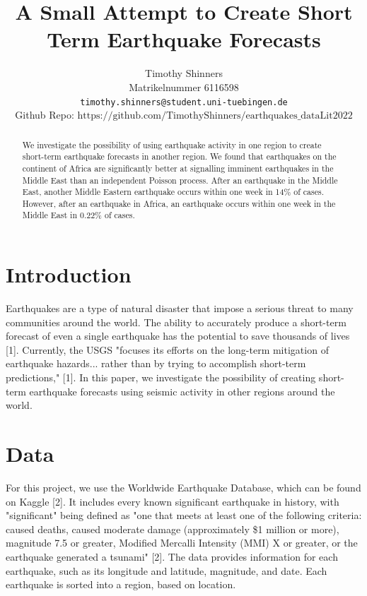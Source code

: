 \documentclass{article}
\title{A Small Attempt to Create Short Term Earthquake Forecasts}
\author{%
  Timothy Shinners\\
  Matrikelnummer 6116598\\
  \texttt{timothy.shinners@student.uni-tuebingen.de} \\
  Github Repo: $\textrm{https://github.com/TimothyShinners/earthquakes\_dataLit2022}$
}
\begin{document}
\maketitle

\begin{abstract}
  We investigate the possibility of using earthquake activity in one region to create short-term earthquake forecasts in another region. We found that earthquakes on the continent of Africa are significantly better at signalling imminent earthquakes in the Middle East than an independent Poisson process. After an earthquake in the Middle East, another Middle Eastern earthquake occurs within one week in 14$\%$ of cases. However, after an earthquake in Africa, an earthquake occurs within one week in the Middle East in 0.22$\%$ of cases.
\end{abstract}


\section{Introduction}

Earthquakes are a type of natural disaster that impose a serious threat to many communities around the world. The ability to accurately produce a short-term forecast of even a single earthquake has the potential to save thousands of lives [1]. Currently, the USGS "focuses its efforts on the long-term mitigation of earthquake hazards... rather than by trying to accomplish short-term predictions," [1]. In this paper, we investigate the possibility of creating short-term earthquake forecasts using seismic activity in other regions around the world. 

\section{Data}

For this project, we use the Worldwide Earthquake Database, which can be found on Kaggle [2]. It includes every known significant earthquake in history, with "significant" being defined as "one that meets at least one of the following criteria: caused deaths, caused moderate damage (approximately \$1 million or more), magnitude 7.5 or greater, Modified Mercalli Intensity (MMI) X or greater, or the earthquake generated a tsunami" [2]. The data provides information for each earthquake, such as its longitude and latitude, magnitude, and date. Each earthquake is sorted into a region, based on location. 
\end{document}
